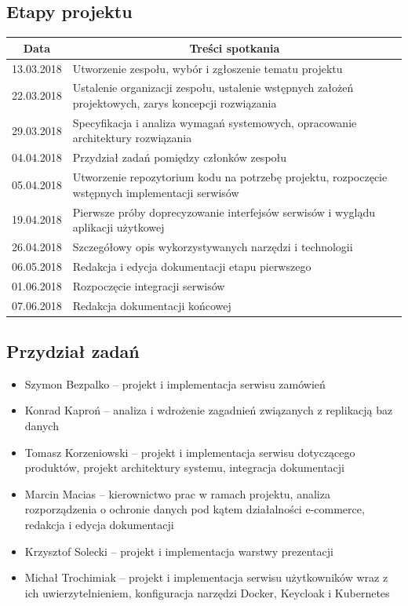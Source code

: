 \documentclass[11pt,a4paper,twoside]{article}
\begin{document}
\subsection{Etapy projektu}
\begin{table}[ht]
\label{etapyProjektu}
\centering
\begin{tabularx}{\textwidth}{|l|X|}
\hline
 \multicolumn{1}{|c|}{Data} & \multicolumn{1}{c|}{Treści spotkania} \\\hline
 13.03.2018 & Utworzenie zespołu, wybór i zgłoszenie tematu projektu \\\hline
 22.03.2018 & Ustalenie organizacji zespołu, ustalenie wstępnych założeń projektowych, zarys koncepcji rozwiązania \\\hline
 29.03.2018 & Specyfikacja i analiza wymagań systemowych, opracowanie architektury rozwiązania \\\hline
 04.04.2018 & Przydział zadań pomiędzy członków zespołu \\\hline
 05.04.2018 & Utworzenie repozytorium kodu na potrzebę projektu, rozpoczęcie wstępnych implementacji serwisów \\\hline
 19.04.2018 & Pierwsze próby doprecyzowanie interfejsów serwisów i wyglądu aplikacji użytkowej \\\hline
 26.04.2018 & Szczegółowy opis wykorzystywanych narzędzi i technologii \\\hline
 06.05.2018 & Redakcja i edycja dokumentacji etapu pierwszego\\\hline
 01.06.2018 & Rozpoczęcie integracji serwisów \\\hline
 07.06.2018 & Redakcja dokumentacji końcowej\\\hline
\end{tabularx}
\end{table}


\subsection{Przydział zadań}
\begin{itemize}
\item Szymon Bezpalko -- projekt i implementacja serwisu zamówień
\item Konrad Kaproń -- analiza i wdrożenie zagadnień związanych z replikacją baz danych
\item Tomasz Korzeniowski -- projekt i implementacja serwisu dotyczącego produktów, projekt architektury systemu, integracja dokumentacji
\item Marcin Macias -- kierownictwo prac w ramach projektu,  analiza rozporządzenia o ochronie danych pod kątem działalności e-commerce, redakcja i edycja dokumentacji
\item Krzysztof Solecki -- projekt i implementacja warstwy prezentacji
\item Michał Trochimiak -- projekt i implementacja serwisu użytkowników wraz z ich uwierzytelnieniem, konfiguracja narzędzi Docker, Keycloak i Kubernetes

\end{itemize}
\end{document}
